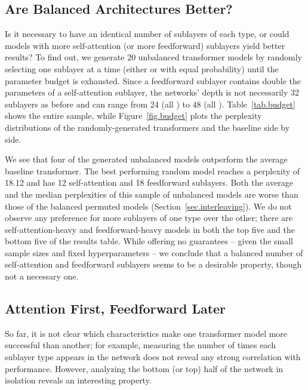 \documentclass[11pt,a4paper]{article}
\begin{document}
\subsection{Are Balanced Architectures Better?}
\label{sec.f_eq_s}

Is it necessary to have an identical number of sublayers of each type, or could models with more self-attention (or more feedforward) sublayers yield better results?
To find out, we generate 20 unbalanced transformer models by randomly selecting one sublayer at a time (either {\Large \texttt{}} or {\Large \texttt{}} with equal probability) until the parameter budget is exhausted. Since a feedforward sublayer contains double the parameters of a self-attention sublayer, the networks' depth is not necessarily 32 sublayers as before and can range from 24 (all {\Large \texttt{}}) to 48 (all {\Large \texttt{}}).
Table~\ref{tab.budget} shows the entire sample, while Figure~\ref{fig.budget} plots the perplexity distributions of the randomly-generated transformers and the baseline side by side.

We see that four of the generated unbalanced models outperform the average baseline transformer.
The best performing random model reaches a perplexity of 18.12 and has 12 self-attention and 18 feedforward sublayers.
Both the average and the median perplexities of this sample of unbalanced models are worse than those of the balanced permuted models (Section~\ref{sec.interleaving}).
We do not observe any preference for more sublayers of one type over the other; there are self-attention-heavy and feedforward-heavy models in both the top five and the bottom five of the results table.
While offering no guarantees -- given the small sample sizes and fixed hyperparameters -- we conclude that a balanced number of self-attention and feedforward sublayers seems to be a desirable property, though not a necessary one.





\subsection{Attention First, Feedforward Later}
\label{sec.analysis}

So far, it is not clear which characteristics make one transformer model more successful than another; for example, measuring the number of times each sublayer type appears in the network does not reveal any strong correlation with performance.
However, analyzing the bottom (or top) half of the network in isolation reveals an interesting property.
\end{document}
